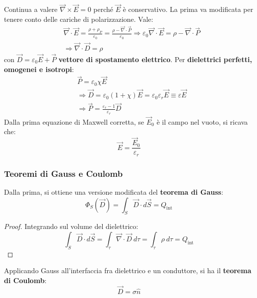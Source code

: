 \documentclass[a4paper]{scrartcl}
\numberwithin{equation}{subsection}
\theoremstyle{style1}
\newenvironment{boxenv}[1][]{
    \begin{eqbox}[#1]
    }{
   \end{eqbox}
}
\begin{document}
Continua a valere $\vec{\nabla }\times \vec{E}=0$ perch\'e $\vec{E}$ \`e conservativo. La prima va modificata per tenere conto delle cariche di polarizzazione. Vale:
\begin{equation}
	\begin{split}
		&\vec{\nabla }\cdot \vec{E} = \frac{\rho  + \rho _P}{\varepsilon _0} = \frac{\rho  - \vec{\nabla }\cdot \vec{P}}{\varepsilon _0} \Rightarrow  \varepsilon _0 \vec{\nabla }\cdot \vec{E} = \rho  - \vec{\nabla }\cdot \vec{P}\\
		&\Rightarrow \vec{\nabla }\cdot \vec{D}= \rho 
	\end{split}
\end{equation}
con $\vec{D} = \varepsilon _0 \vec{E}+\vec{P}$ \textbf{vettore di spostamento elettrico}. Per \textbf{dielettrici perfetti, omogenei e isotropi}:
\begin{equation}
	\begin{split}
		&\vec{P} = \varepsilon _0 \chi \vec{E} \\
		&\Rightarrow  \vec{D} = \varepsilon _0 (1+\chi )\vec{E} = \varepsilon _0 \varepsilon _r \vec{E}\equiv \varepsilon \vec{E}\\
		&\Rightarrow \vec{ P} = \frac{\varepsilon _r -1}{\varepsilon _r}\vec{D}
	\end{split}
\end{equation}
Dalla prima equazione di Maxwell corretta, se $\vec{E}_0$ \`e il campo nel vuoto, si ricava che:
\begin{equation}
	\vec{E} = \frac{\vec{E}_0}{\varepsilon _r}
\end{equation}
\subsubsection{Teoremi di Gauss e Coulomb}

Dalla prima, si ottiene una versione modificata del \textbf{teorema di Gauss}:
\begin{equation}
	\Phi_S (\vec{D}) = \int_{S} \vec{D}\cdot d\vec{S} = Q_\text{int}
\end{equation}
\begin{boxenv}[]
\begin{proof}
Integrando sul volume del dielettrico:
\begin{equation}
	\int_{S} \vec{D} \cdot d\vec{S}=\int_{\tau } \vec{\nabla }\cdot \vec{D} \ d\tau = \int_{\tau } \rho \ d\tau  = Q_\text{int}
\end{equation}
\end{proof}
\end{boxenv}
\noindent Applicando Gauss all'interfaccia fra dielettrico e un conduttore, si ha il \textbf{teorema di Coulomb}:
\begin{equation}
\vec{D} = \sigma \hat{n}
\end{equation}
\end{document}

